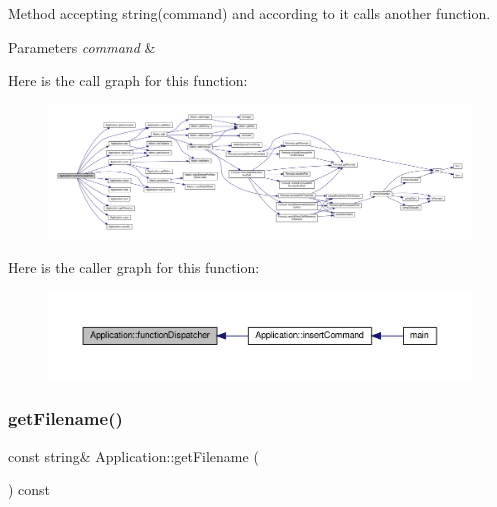 Method accepting string(command) and according to it calls another function. 
\begin{DoxyParams}{Parameters}
{\em command} & \\
\hline
\end{DoxyParams}
Here is the call graph for this function\+:
\nopagebreak
\begin{figure}[H]
\begin{center}
\leavevmode
\includegraphics[width=350pt]{class_application_a00241f0a09c32b0ef3cb1f068475cc50_cgraph}
\end{center}
\end{figure}
Here is the caller graph for this function\+:
\nopagebreak
\begin{figure}[H]
\begin{center}
\leavevmode
\includegraphics[width=350pt]{class_application_a00241f0a09c32b0ef3cb1f068475cc50_icgraph}
\end{center}
\end{figure}
\mbox{\label{class_application_a778575fb76de5352152d8928e1c3410f}} 
\subsubsection{\texorpdfstring{get\+Filename()}{getFilename()}}
{\footnotesize\ttfamily const string\& Application\+::get\+Filename (\begin{DoxyParamCaption}{ }\end{DoxyParamCaption}) const\hspace{0.3cm}{\ttfamily [inline]}}

